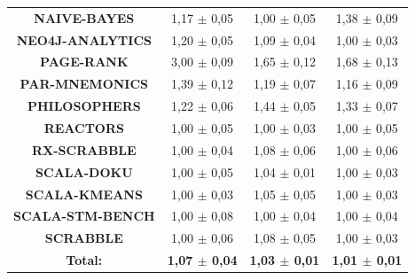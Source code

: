 \documentclass[]{usiinfthesis}
\begin{document}
\begin{table}
\begin{tabular}{|c|c|c|c|}
\textbf{	NAIVE-BAYES	}&	 1,17 	 $\pm$ 	 0,05 	 & 	 1,00 	 $\pm$ 	 0,05 	 & 	 1,38 	 $\pm$ 	 0,09 	\\
\textbf{	NEO4J-ANALYTICS	}&	 1,20 	 $\pm$ 	 0,05 	 & 	 1,09 	 $\pm$ 	 0,04 	 & 	 1,00 	 $\pm$ 	 0,03 	\\
\textbf{	PAGE-RANK	}&	 3,00 	 $\pm$ 	 0,09 	 & 	 1,65 	 $\pm$ 	 0,12 	 & 	 1,68 	 $\pm$ 	 0,13 	\\
\textbf{	PAR-MNEMONICS	}&	 1,39 	 $\pm$ 	 0,12 	 & 	 1,19 	 $\pm$ 	 0,07 	 & 	 1,16 	 $\pm$ 	 0,09 	\\
\textbf{	PHILOSOPHERS	}&	 1,22 	 $\pm$ 	 0,06 	 & 	 1,44 	 $\pm$ 	 0,05 	 & 	 1,33 	 $\pm$ 	 0,07 	\\
\textbf{	REACTORS	}&	 1,00 	 $\pm$ 	 0,05 	 & 	 1,00 	 $\pm$ 	 0,03 	 & 	 1,00 	 $\pm$ 	 0,05 	\\
\textbf{	RX-SCRABBLE	}&	 1,00 	 $\pm$ 	 0,04 	 & 	 1,08 	 $\pm$ 	 0,06 	 & 	 1,00 	 $\pm$ 	 0,06 	\\
\textbf{	SCALA-DOKU	}&	 1,00 	 $\pm$ 	 0,05 	 & 	 1,04 	 $\pm$ 	 0,01 	 & 	 1,00 	 $\pm$ 	 0,03 	\\
\textbf{	SCALA-KMEANS	}&	 1,00 	 $\pm$ 	 0,03 	 & 	 1,05 	 $\pm$ 	 0,05 	 & 	 1,00 	 $\pm$ 	 0,03 	\\
\textbf{	SCALA-STM-BENCH	}&	 1,00 	 $\pm$ 	 0,08 	 & 	 1,00 	 $\pm$ 	 0,04 	 & 	 1,00 	 $\pm$ 	 0,04 	\\
\textbf{	SCRABBLE	}&	 1,00 	 $\pm$ 	 0,06 	 & 	 1,08 	 $\pm$ 	 0,05 	 & 	 1,00 	 $\pm$ 	 0,03 	\\
\hline
\textbf{	Total:	}&	\textbf{1,07 	$\pm$		 0,04 } & \textbf{1,03 	$\pm$		 0,01 }&\textbf{ 1,01 	$\pm$		 0,01}\\
\hline
\end{tabular}
\end{table}%
\end{document}
